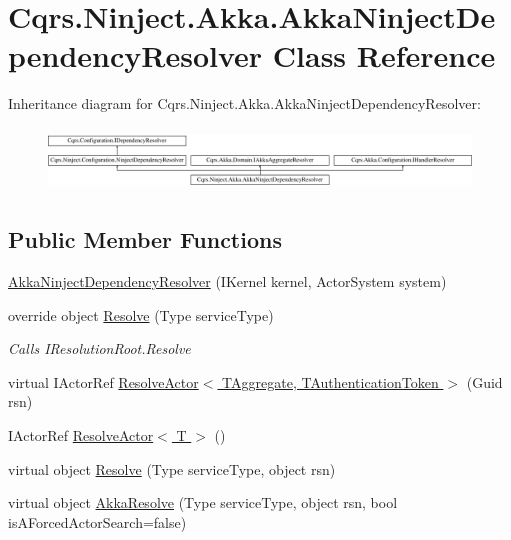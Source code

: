 \hypertarget{classCqrs_1_1Ninject_1_1Akka_1_1AkkaNinjectDependencyResolver}{}\section{Cqrs.\+Ninject.\+Akka.\+Akka\+Ninject\+Dependency\+Resolver Class Reference}
\label{classCqrs_1_1Ninject_1_1Akka_1_1AkkaNinjectDependencyResolver}
Inheritance diagram for Cqrs.\+Ninject.\+Akka.\+Akka\+Ninject\+Dependency\+Resolver\+:\begin{figure}[H]
\begin{center}
\leavevmode
\includegraphics[height=1.676647cm]{classCqrs_1_1Ninject_1_1Akka_1_1AkkaNinjectDependencyResolver}
\end{center}
\end{figure}
\subsection*{Public Member Functions}
\begin{DoxyCompactItemize}
\item 
\hyperlink{classCqrs_1_1Ninject_1_1Akka_1_1AkkaNinjectDependencyResolver_a7fdff6e54ac903d86bb79bf5536f8820}{Akka\+Ninject\+Dependency\+Resolver} (I\+Kernel kernel, Actor\+System system)
\item 
override object \hyperlink{classCqrs_1_1Ninject_1_1Akka_1_1AkkaNinjectDependencyResolver_adace29de71f10e34e952bd41e48106a6}{Resolve} (Type service\+Type)
\begin{DoxyCompactList}\small\item\em Calls I\+Resolution\+Root.\+Resolve \end{DoxyCompactList}\item 
virtual I\+Actor\+Ref \hyperlink{classCqrs_1_1Ninject_1_1Akka_1_1AkkaNinjectDependencyResolver_ab5ba20875aab8764bbb7d6df61722436}{Resolve\+Actor$<$ T\+Aggregate, T\+Authentication\+Token $>$} (Guid rsn)
\item 
I\+Actor\+Ref \hyperlink{classCqrs_1_1Ninject_1_1Akka_1_1AkkaNinjectDependencyResolver_a6c3399c949a77457456d77688eb66054}{Resolve\+Actor$<$ T $>$} ()
\item 
virtual object \hyperlink{classCqrs_1_1Ninject_1_1Akka_1_1AkkaNinjectDependencyResolver_ab860d9bcf44b62098a8df91bbcb5013d}{Resolve} (Type service\+Type, object rsn)
\item 
virtual object \hyperlink{classCqrs_1_1Ninject_1_1Akka_1_1AkkaNinjectDependencyResolver_a8e55618bf89a2c14bc3d0e7b3253f17d}{Akka\+Resolve} (Type service\+Type, object rsn, bool is\+A\+Forced\+Actor\+Search=false)
\end{DoxyCompactItemize}
